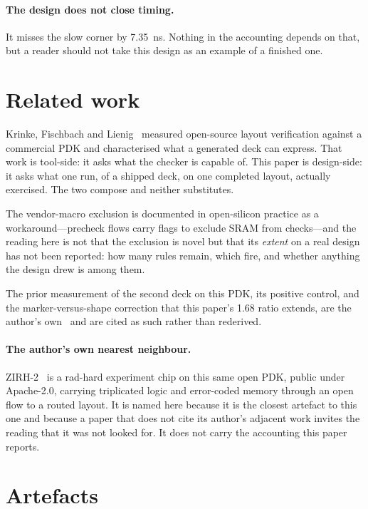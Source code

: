 \documentclass[11pt,a4paper]{article}
\begin{document}
\paragraph{The design does not close timing.} It misses the slow corner
by \SI{7.35}{\nano\second}. Nothing in the accounting depends on that,
but a reader should not take this design as an example of a finished one.

\section{Related work}
\label{sec:related}

Krinke, Fischbach and Lienig~\cite{krinke2024} measured open-source
layout verification against a commercial PDK and characterised what a generated deck can
express. That work is tool-side: it asks what the checker is capable of.
This paper is design-side: it asks what one run, of a shipped deck, on
one completed layout, actually exercised. The two compose and neither
substitutes.

The vendor-macro exclusion is documented in open-silicon practice as a
workaround---precheck flows carry flags to exclude SRAM from
checks---and the reading here is not that the exclusion is novel but that
its \emph{extent} on a real design has not been reported: how many rules
remain, which fire, and whether anything the design drew is among them.

The prior measurement of the second deck on this PDK, its positive
control, and the marker-versus-shape correction that this paper's
\num{1.68} ratio extends, are the author's own~\cite{companion} and are
cited as such rather than rederived.

\paragraph{The author's own nearest neighbour.} ZIRH-2~\cite{zirh2} is a
rad-hard
experiment chip on this same open PDK, public under Apache-2.0, carrying
triplicated logic and error-coded memory through an open flow to a routed
layout. It is named here because it is the closest artefact to this one
and because a paper that does not cite its author's adjacent work invites
the reading that it was not looked for. It does not carry the accounting
this paper reports.

\section{Artefacts}
\label{sec:artefacts}
\end{document}
